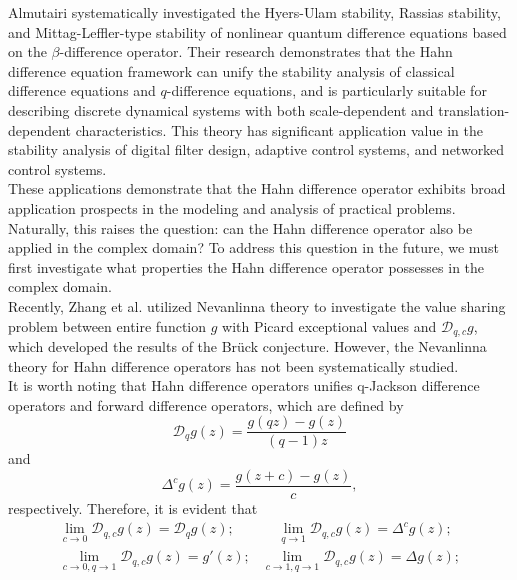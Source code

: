 \documentclass[sn-mathphys-num]{sn-jnl}%
\theoremstyle{thmstyleone}%
\theoremstyle{thmstyletwo}%
\theoremstyle{thmstylethree}%
\begin{document}
Almutairi \cite{Alm} systematically investigated the Hyers-Ulam stability, Rassias stability, and Mittag-Leffler-type stability of nonlinear quantum difference equations based on the \(\beta\)-difference operator. Their research demonstrates that the Hahn difference equation framework can unify the stability analysis of classical difference equations and \(q\)-difference equations, and is particularly suitable for describing discrete dynamical systems with both scale-dependent and translation-dependent characteristics. This theory has significant application value in the stability analysis of digital filter design, adaptive control systems, and networked control systems.\\
\indent These applications demonstrate that the Hahn difference operator exhibits broad application prospects in the modeling and analysis of practical problems. Naturally, this raises the question: can the Hahn difference operator also be applied in the complex domain? To address this question in the future, we must first investigate what properties the Hahn difference operator possesses in the complex domain.\\
\indent Recently, Zhang et al. \cite{Zhang} utilized Nevanlinna theory to investigate the value sharing problem between entire function \(g\) with Picard exceptional values and \(\mathcal{D}_{q,c}g\), which developed the results of the Br\"{u}ck conjecture. However, the Nevanlinna theory for Hahn difference operators has not been systematically studied.\\	
\indent It is worth noting that Hahn difference operators unifies q-Jackson difference operators and forward difference operators, which are defined by
\begin{equation*}
	\mathcal{D}_{q}g(z)=\frac{g(qz)-g(z)}{(q-1)z}
\end{equation*}
and
\begin{equation*}
	\Delta^{c}g(z)=\frac{g(z+c)-g(z)}{c},
\end{equation*}
respectively. Therefore, it is evident that
\begin{align*}
	\lim\limits_{c\rightarrow0}\mathcal{D}_{q,c}g(z)=\mathcal{D}_{q}g(z);&~~~~~\lim\limits_{q\rightarrow1}\mathcal{D}_{q,c}g(z)=\Delta^{c}g(z);\\
	\lim\limits_{c\rightarrow0,q\rightarrow1}\mathcal{D}_{q,c}g(z)=g'(z);& \lim\limits_{c\rightarrow1,q\rightarrow1}\mathcal{D}_{q,c}g(z)=\Delta g(z);
\end{align*}	
\end{document}
